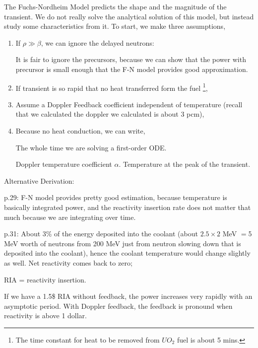 \documentclass{school-22.211-notes}
\date{April 30, 2012}
\begin{document}
\maketitle

The Fuchs-Nordheim Model predicts the shape and the magnitude of the transient. We do not really solve the analytical solution of this model, but instead study some characteristics from it. To start, we make three assumptions, 
\begin{enumerate}
\item If $\rho \gg \beta$, we can ignore the delayed neutrons:

It is fair to ignore the precursors, because we can show that the power with precursor is small enough that the F-N model provides good approximation. 

\item If transient is so rapid that no heat transferred form the fuel \footnote{The time constant for heat to be removed from $UO_2$ fuel is about 5 mins.}, 

\item Assume a Doppler Feedback coefficient independent of temperature (recall that we calculated the doppler we calculated is about 3 pcm), 

\item Because no heat conduction, we can write, 

The whole time we are solving a first-order ODE. 


Doppler temperature coefficient $\alpha$. Temperature at the peak of the transient. 
\end{enumerate}
Alternative Derivation: 


p.29: F-N model provides pretty good estimation, because temperature is basically integrated power, and the reactivity insertion rate does not matter that much because we are integrating over time. 


p.31: About 3\% of the energy deposited into the coolant (about $2.5 \times 2$ MeV $=$5 MeV worth of neutrons from 200 MeV just from neutron slowing down that is deposited into the coolant), hence the coolant temperature would change slightly as well. Net reactivity comes back to zero; 




RIA = reactivity insertion. 

If we have a 1.5\$ RIA without feedback, the power increases very rapidly with an asymptotic period. With Doppler feedback, the feedback is pronound when reactivity is above 1 dollar. 
\end{document}
